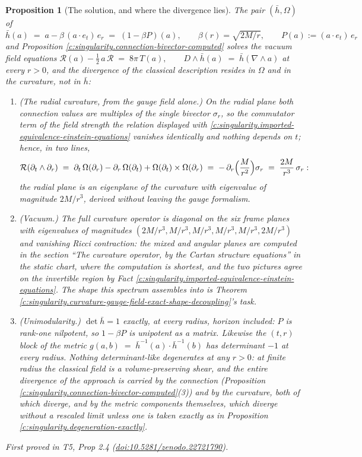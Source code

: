 \documentclass[11pt]{article}
\newtheorem{proposition}[theorem]{Proposition}
\theoremstyle{definition}
\theoremstyle{plain}
\providecommand{\er}{}\renewcommand{\er}{e_r}
\providecommand{\et}{}\renewcommand{\et}{e_t}
\providecommand{\hb}{}\renewcommand{\hb}{\bar{h}}
\begin{document}
\begin{proposition}[The solution, and where the divergence lies]\label{c:singularity.solution-where-divergence-lies}
The pair $(\hb, \Omega)$ of $\hb(a) \;=\; a - \beta\,(a \cdot \et)\,\er \;=\; (1 - \beta P)(a), \qquad \beta(r) = \sqrt{2M/r}, \qquad P(a) := (a \cdot \et)\,\er$ and Proposition \ref{c:singularity.connection-bivector-computed} solves the vacuum field equations $\mathcal{R}(a) - \tfrac12\, a\, \mathcal{R} \;=\; 8\pi\, T(a), \qquad D \wedge \hb(a) \;=\; \hb(\nabla \wedge a)$ at every $r > 0$, and the divergence of the classical description resides in $\Omega$ and in the curvature, not in $\hb$:
\begin{enumerate}
\item (The radial curvature, from the gauge field alone.) On the radial plane both connection values are multiples of the single bivector $\sigma_r$, so the commutator term of the field strength the relation displayed with \ref{c:singularity.imported-equivalence-einstein-equations} vanishes identically and nothing depends on $t$; hence, in two lines,
\[
\mathcal{R}(\partial_t \wedge \partial_r)
\;=\; \partial_t\,\Omega(\partial_r) - \partial_r\,\Omega(\partial_t) + \Omega(\partial_t)\times\Omega(\partial_r)
\;=\; -\,\partial_r\Bigl(\frac{M}{r^2}\Bigr)\sigma_r
\;=\; \frac{2M}{r^3}\,\sigma_r :
\]
the radial plane is an eigenplane of the curvature with eigenvalue of magnitude $2M/r^3$, derived without leaving the gauge formalism.
\item (Vacuum.) The full curvature operator is diagonal on the six frame planes with eigenvalues of magnitudes $(2M/r^3, M/r^3, M/r^3, M/r^3, M/r^3, 2M/r^3)$ and vanishing Ricci contraction: the mixed and angular planes are computed in the section ``The curvature operator, by the Cartan structure equations'' in the static chart, where the computation is shortest, and the two pictures agree on the invertible region by Fact \ref{c:singularity.imported-equivalence-einstein-equations}. The shape this spectrum assembles into is Theorem \ref{c:singularity.curvature-gauge-field-exact-shape-decoupling}'s task.
\item (Unimodularity.) $\det \hb = 1$ exactly, at every radius, horizon included: $P$ is rank-one nilpotent, so $1 - \beta P$ is unipotent as a matrix. Likewise the $(t,r)$ block of the metric $g(a,b) \;=\; \hb^{-1}(a) \cdot \hb^{-1}(b)$ has determinant $-1$ at every radius. Nothing determinant-like degenerates at any $r > 0$: at finite radius the classical field is a volume-preserving shear, and the entire divergence of the approach is carried by the connection (Proposition \ref{c:singularity.connection-bivector-computed}(3)) and by the curvature, both of which diverge, and by the metric components themselves, which diverge without a rescaled limit unless one is taken exactly as in Proposition \ref{c:singularity.degeneration-exactly}.
\end{enumerate}
\emph{First proved in} T5, Prop 2.4 (\href{https://doi.org/10.5281/zenodo.22721790}{doi:10.5281/zenodo.22721790}).
\end{proposition}
\end{document}
